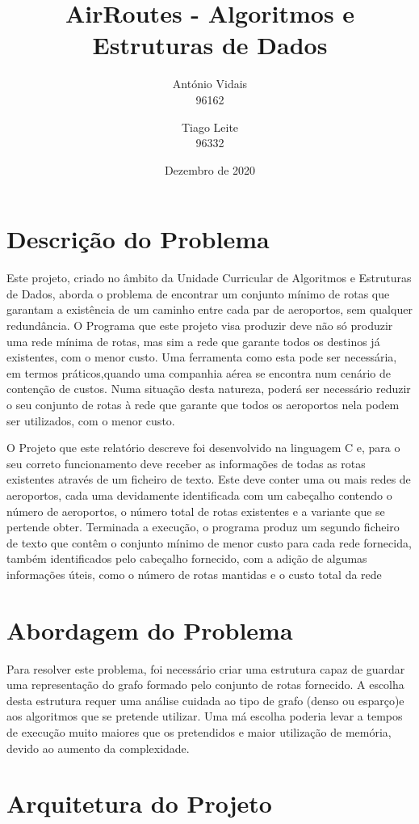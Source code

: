 \documentclass[14pt]{article}
\title{AirRoutes - Algoritmos e Estruturas de Dados}
\date{Dezembro de 2020}
\author{António Vidais \\96162 \and Tiago Leite \\96332}
\begin{document}
    \maketitle
    \section{Descrição do Problema}
    Este projeto, criado no âmbito da Unidade Curricular de Algoritmos e Estruturas de Dados, aborda o problema de
    encontrar um conjunto mínimo de rotas que garantam a existência de um caminho entre cada par de aeroportos,
    sem qualquer redundância. O Programa que este projeto visa produzir deve não
    só produzir uma rede mínima de rotas, mas sim a rede que garante todos os destinos já existentes, com o menor
    custo.
    Uma ferramenta como esta pode ser necessária, em termos práticos,quando uma companhia aérea se encontra num cenário
    de contenção de custos.
    Numa situação desta natureza, poderá ser necessário reduzir o seu conjunto de rotas à rede que
    garante que todos os aeroportos nela podem ser utilizados, com o menor custo.

    O Projeto que este relatório descreve foi desenvolvido na linguagem C e, para o seu correto funcionamento deve
    receber as informações de todas as rotas existentes através de um ficheiro de texto.
    Este deve conter uma ou mais redes de aeroportos, cada uma devidamente identificada com um cabeçalho contendo o
    número de aeroportos, o número total de rotas existentes e a variante que se pertende obter.
    Terminada a execução, o programa produz um segundo ficheiro de texto que contêm o conjunto mínimo de menor custo
    para cada rede fornecida, também identificados pelo cabeçalho fornecido, com a adição de algumas informações úteis,
    como o número de rotas mantidas e o custo total da rede

    \section{Abordagem do Problema}
    Para resolver este problema, foi necessário criar uma estrutura capaz de guardar uma representação do grafo formado
    pelo conjunto de rotas fornecido.
    A escolha desta estrutura requer uma análise cuidada ao tipo de grafo (denso ou esparço)e aos algoritmos que se
    pretende utilizar.
    Uma má escolha poderia levar a tempos de execução muito maiores que os pretendidos e maior utilização de memória,
    devido ao aumento da complexidade.
    
    \section{Arquitetura do Projeto}
\end{document}
